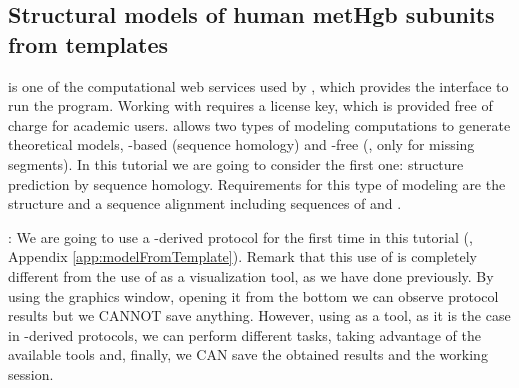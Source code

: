 \subsection*{Structural models of human metHgb subunits from templates}

 \modeller \citep{sali1993} is one of the computational web services used by \chimera, which provides the interface to run the program. Working with \modeller requires a license key, which is provided free of charge for academic users. \modeller allows two types of modeling computations to generate theoretical models, -based (sequence homology) and -free (, only for missing segments). In this tutorial we are going to consider the first one: structure prediction by sequence homology. Requirements for this type of modeling are the  structure and a sequence alignment including sequences of  and . 
 
 : We are going to use a \chimera-derived protocol for the first time in this tutorial (, Appendix \ref{app:modelFromTemplate}). Remark that this use of \chimera is completely different from the use of \chimera as a visualization tool, as we have done previously. By using the \chimera graphics window, opening it from the \scipion bottom  we can observe protocol results but we CANNOT save anything. However, using \chimera as a tool, as it is the case in \scipion \chimera-derived protocols, we can perform different tasks, taking advantage of the available \chimera tools and, finally, we CAN save the obtained results and the working session.    
 
